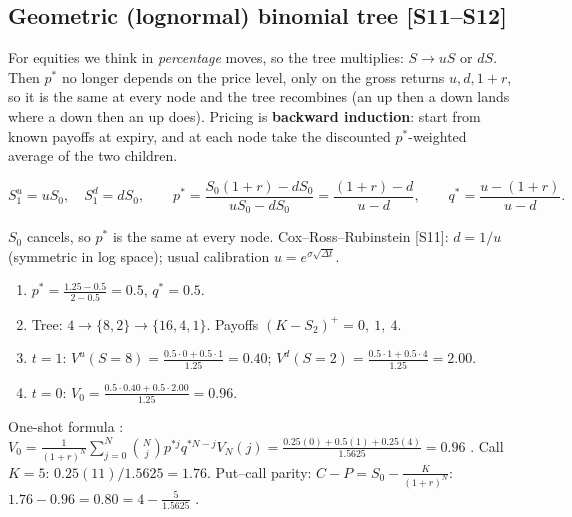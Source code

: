 \documentclass[10pt]{article}
\begin{document}
\subsection{Geometric (lognormal) binomial tree [S11--S12]}
\begin{idea}
For equities we think in \emph{percentage} moves, so the tree multiplies: $S\to uS$ or $dS$. Then $p^*$ no longer depends on the price level, only on the gross returns $u,d,1+r$, so it is the same at every node and the tree recombines (an up then a down lands where a down then an up does). Pricing is \textbf{backward induction}: start from known payoffs at expiry, and at each node take the discounted $p^*$-weighted average of the two children.
\end{idea}
\[S^u_1=uS_0,\quad S^d_1=dS_0,\qquad p^*=\frac{S_0(1+r)-dS_0}{uS_0-dS_0}=\frac{(1+r)-d}{u-d},\qquad q^*=\frac{u-(1+r)}{u-d}.\]
\begin{where}
\end{where}
$S_0$ cancels, so $p^*$ is the same at every node. Cox--Ross--Rubinstein [S11]: $d=1/u$ (symmetric in log space); \beyond{} usual calibration $u=e^{\sigma\sqrt{\Delta t}}$.
\begin{worked}[{Slide example {[S12]}: European put, $S_0=4$, $u=2$, $d=\frac12$, $r=25\%$, $K=5$, $t=2$}]
\begin{enumerate}
\item $p^*=\frac{1.25-0.5}{2-0.5}=0.5$, $q^*=0.5$.
\item Tree: $4\to\{8,2\}\to\{16,4,1\}$. Payoffs $(K-S_2)^+=0,\ 1,\ 4$.
\item $t=1$: $V^u(S=8)=\frac{0.5\cdot0+0.5\cdot1}{1.25}=0.40$; $V^d(S=2)=\frac{0.5\cdot1+0.5\cdot4}{1.25}=2.00$.
\item $t=0$: $V_0=\frac{0.5\cdot0.40+0.5\cdot2.00}{1.25}=0.96$.
\end{enumerate}
One-shot formula \beyond: $V_0=\frac{1}{(1+r)^N}\sum_{j=0}^N\binom Nj p^{*j}q^{*N-j}V_N(j)=\frac{0.25(0)+0.5(1)+0.25(4)}{1.5625}=0.96$ \checkmark. Call $K=5$: $0.25(11)/1.5625=1.76$. Put--call parity: $C-P=S_0-\frac{K}{(1+r)^N}$: $1.76-0.96=0.80=4-\frac{5}{1.5625}$ \checkmark.
\end{worked}
\end{document}
